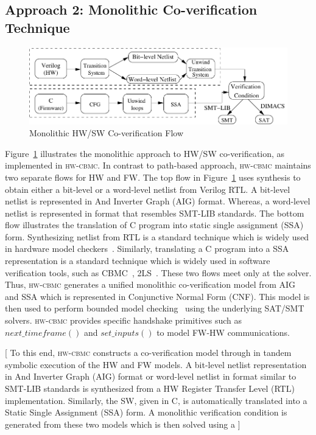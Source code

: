 \documentclass[sigconf]{acmart}
\newcommand{\rmcmt}[1]{{\color{magenta} [{#1}]}}
\newcommand{\tool}[1]{\textsc{#1}\xspace}
\newcommand{\hwcbmcv}{\tool{hw-cbmc}}
\newcommand{\Omit}[1]{}
\begin{document}
\subsection{Approach 2: Monolithic Co-verification Technique}
%
\begin{figure}[t]
\begin{center}
\includegraphics[scale=0.6]{figures/traditional_flow.pdf}
\caption{Monolithic HW/SW Co-verification Flow}
\label{fig:conventional}
\end{center}
\end{figure}
%
Figure~\ref{fig:conventional} illustrates the monolithic approach to HW/SW
co-veri\-fi\-cation, as implemented in \hwcbmcv.  
In contrast to path-based approach,
\hwcbmcv maintains two separate flows for HW and FW.  The top flow in
Figure~\ref{fig:conventional} uses synthesis to obtain either a bit-level or
a word-level netlist from Verilog RTL.  A bit-level netlist is represented 
in And Inverter Graph (AIG) format.  Whereas, a word-level netlist is represented 
in format that resembles SMT-LIB standards.  The bottom flow illustrates the
translation of C program into static single assignment (SSA) form. 
Synthesizing netlist from RTL is a standard technique which is widely 
used in hardware model checkers~\cite{}. Similarly, translating a C program 
into a SSA representation is a standard technique which is widely used in 
software verification tools, such as CBMC~\cite{}, 2LS~{}. 
These two flows meet only at the solver.  Thus, \hwcbmcv generates a
unified monolithic co-verification model from AIG and SSA which is 
represented in Conjunctive Normal Form (CNF).  This model is then used to perform 
bounded model checking~\cite{} using the underlying SAT/SMT solvers.  
\hwcbmcv provides specific handshake primitives such
as $next\_timeframe()$ and $set\_inputs()$ to model FW-HW communications.



\rmcmt{
To this end, \hwcbmcv constructs a co-verification model through 
in tandem symbolic execution of the HW and FW models.  A bit-level 
netlist representation in And Inverter Graph (AIG) format or word-level netlist in
format similar to SMT-LIB standards is synthesized from a HW Register Transfer 
Level (RTL) implementation. Similarly, the SW, given in C, is automatically 
translated into a Static Single Assignment (SSA) form.  A monolithic verification 
condition is generated from these two models which is then solved using a 
}
%
\Omit{
The hardware and firmware run independently of each other. 
The communication between them takes place through these function calls. 
}
\end{document}
